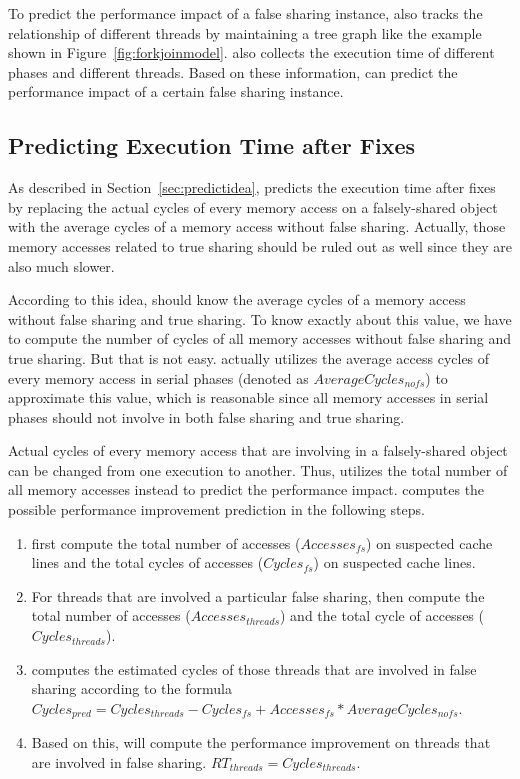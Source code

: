 To predict the performance impact of a false sharing instance, \Cheetah{} also tracks the relationship of different threads by maintaining a tree graph like the example shown in Figure~\ref{fig:forkjoinmodel}. \Cheetah{} also collects the execution time of different phases and different threads. Based on these information, \Cheetah{} can predict the performance impact of a certain false sharing instance. 
 
\subsection{Predicting Execution Time after Fixes}
\label{sec:predicttime}

As described in Section~\ref{sec:predictidea}, \cheetah{} predicts the execution time after fixes by replacing the actual cycles of every memory access on a falsely-shared object with the average cycles of a memory access without false sharing. Actually, those memory accesses related to true sharing should be ruled out as well since they are also much slower. 

According to this idea, \cheetah{} should know the average cycles of a memory access without false sharing and true sharing. To know exactly about this value, we have to compute the number of cycles of all memory accesses without false sharing and true sharing. But that is not easy. \Cheetah{} actually utilizes the average access cycles of every memory access in serial phases (denoted as $AverageCycles_{nofs}$) to approximate this value, which is reasonable since all memory accesses in serial phases should not involve in both false sharing and true sharing. 

Actual cycles of every memory access that are involving in a falsely-shared object can be changed from one execution to another. Thus, \cheetah{} utilizes the total number of all memory accesses instead to predict the performance impact. \Cheetah{} computes the possible performance improvement prediction in the following steps.
 
\begin{enumerate}
\item \cheetah{} first compute the total number of accesses ($Accesses_{fs}$) on suspected cache lines and the total cycles of accesses ($Cycles_{fs}$) on suspected cache lines.

\item For threads that are involved a particular false sharing, \cheetah{} then compute the total number of accesses ($Accesses_{threads}$) and the total cycle of accesses ($Cycles_{threads}$). 

\item \Cheetah{} computes the estimated cycles of those threads that are involved in false sharing according to the formula $Cycles_{pred} = Cycles_{threads} - Cycles_{fs} + Accesses_{fs} * AverageCycles_{nofs}$. 

\item  Based on this, \cheetah{} will compute the performance improvement on threads that are involved in false sharing.
$RT_{threads} = Cycles_{threads}  $. 

\end{enumerate}



